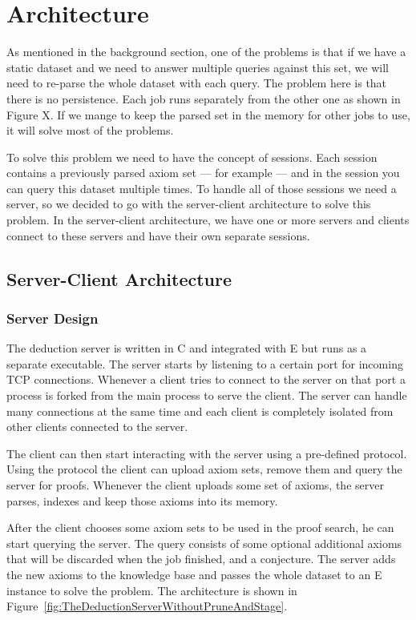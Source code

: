 \chapter{Architecture}

As mentioned in the background section, one of the problems is that if we have a static dataset and we need to answer multiple queries against this set, we will need to re-parse the whole dataset with each query. The problem here is that there is no persistence. Each job runs separately from the other one as shown in Figure X. If we mange to keep the parsed set in the memory for other jobs to use, it will solve most of the problems.

To solve this problem we need to have the concept of sessions. Each session contains a previously parsed axiom set --- for example --- and in the session you can query this dataset multiple times. To handle all of those sessions we need a server, so we decided to go with the server-client architecture to solve this problem. In the server-client architecture, we have one or more servers and clients connect to these servers and have their own separate sessions.

\section{Server-Client Architecture}
\subsection{Server Design}
The deduction server is written in C and integrated with E but runs as a separate executable. The server starts by listening to a certain port for incoming TCP connections. Whenever a client tries to connect to the server on that port a process is forked from the main process to serve the client. The server can handle many connections at the same time and each client is completely isolated from other clients connected to the server.

The client can then start interacting with the server using a pre-defined protocol. Using the protocol the client can upload axiom sets, remove them and query the server for proofs. Whenever the client uploads some set of axioms, the server parses, indexes and keep those axioms into its memory. 

After the client chooses some axiom sets to be used in the proof search, he can start querying the server. The query consists of some optional additional axioms that will be discarded when the job finished, and a conjecture. The server adds the new axioms to the knowledge base and passes the whole dataset to an E instance to solve the problem. The architecture is shown in Figure~\ref{fig:TheDeductionServerWithoutPruneAndStage}.

